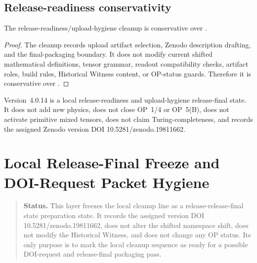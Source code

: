 \subsection{Release-readiness conservativity}
\label{subsec:v4014-release-readiness-conservativity}

\begin{theorem}
\label{thm:v4014-release-readiness-upload-hygiene-conservativity}
The  release-readiness/upload-hygiene cleanup is conservative over
.
\end{theorem}

\begin{proof}
The cleanup records upload artifact selection, Zenodo description drafting, and
the final-packaging boundary. It does not modify current shifted mathematical
definitions, tensor grammar, readout compatibility checks, artifact roles,
build rules, Historical Witness content, or OP-status guards. Therefore it is
conservative over .
\end{proof}

\begin{remark}
\label{rem:v4014-non-claim}
Version~4.0.14 is a local release-readiness and upload-hygiene release-final state. It
does not add new physics, does not close OP~1/4 or OP~5(B), does not activate
primitive mixed tensors, does not claim Turing-completeness, and records the assigned Zenodo version DOI 10.5281/zenodo.19811662.
\end{remark}



\clearpage
\section{ Local Release-Final Freeze and DOI-Request Packet Hygiene}
\label{sec:v4015-local-release-release-final state-freeze-doi-request-packet-hygiene}

\begin{quote}\small
\noindent\textbf{Status.}
This  layer freezes the local cleanup line as a release-release-final state
preparation state. It records the assigned version DOI 10.5281/zenodo.19811662, does not alter the shifted
namespace shift, does not modify the Historical Witness, and does not change
any OP status. Its only purpose is to mark the local cleanup sequence as ready
for a possible DOI-request and release-final packaging pass.
\end{quote}

